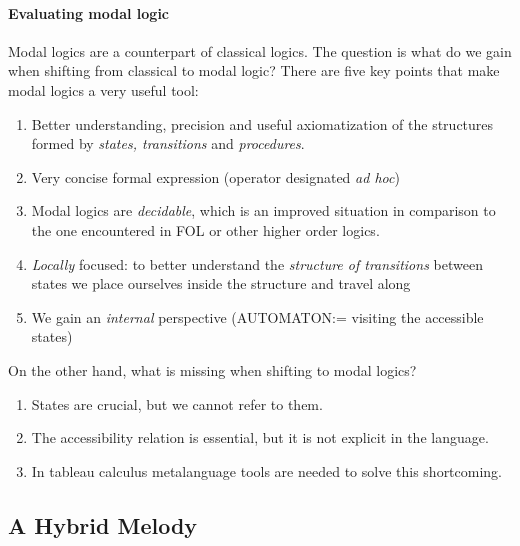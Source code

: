 \paragraph{Evaluating modal logic}

Modal logics are a counterpart of classical logics. The question is what do
we gain when shifting from classical to modal logic? There are five key
points that make modal logics a very useful tool:

\begin{enumerate}
\item Better understanding, precision and useful axiomatization of the
structures formed by \emph{states, transitions} and \emph{procedures}.

\item Very concise formal expression (operator designated \emph{ad hoc})

\item Modal logics are \emph{decidable}, which is an improved situation in
comparison to the one encountered in FOL or other higher order logics.

\item \emph{Locally} focused: to better understand the \emph{structure of
transitions} between states we place ourselves inside the structure and
travel along

\item We gain an \emph{internal }perspective (AUTOMATON:= visiting the
accessible states)
\end{enumerate}

On the other hand, what is missing when shifting to modal logics?

\begin{enumerate}
\item States are crucial, but we cannot refer to them.

\item The accessibility relation is essential, but it is not explicit in the
language.

\item In tableau calculus metalanguage tools are needed to solve this
shortcoming.
\end{enumerate}


\subsection{A Hybrid Melody}

